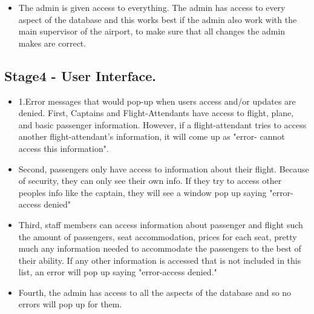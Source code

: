 \documentclass[10pt,conference]{IEEEtran}
\begin{document}
\begin{itemize} \item{The admin is given access to everything. The admin has access to every aspect of the database and this works best if the admin also work with the main supervisor of the airport, to make sure that all changes the admin makes are correct. } \end{itemize} 

\newpage\subsection{Stage4 -	User Interface. }\label{sec: 4.	User Interface.}



\begin{itemize} \item{1.Error messages that would pop-up when users access and/or updates are denied.
First, Captains and Flight-Attendants have access to flight, plane, and basic passenger information. However, if a flight-attendant tries to access another flight-attendant's information, it will come up as "error- cannot access this information".} \end{itemize}

\begin{itemize} \item{Second, passengers only have access to information about their flight. Because of security, they can only see their own info. If they try to access other peoples info like the captain, they will see a window pop up saying "error-access denied"} \end{itemize}

\begin{itemize} \item{Third, staff members can access information about passenger and flight such the amount of passengers, seat accommodation, prices for each seat, pretty much any information needed to accommodate the passengers to the best of their ability. If any other information is accessed that is not included in this list, an error will pop up saying "error-access denied."} \end{itemize}

\begin{itemize} \item{Fourth, the admin has access to all the aspects of the database and so no errors will pop up for them.} \end{itemize}
\end{document}
